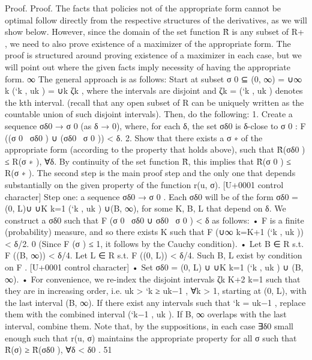 \documentclass[10pt]{article}
\begin{document}
\begin{ReviewVerbatim}
Proof. Proof. The facts that policies not of the appropriate form cannot be optimal follow directly
from the respective structures of the derivatives, as we will show below. However, since the domain
of the set function R̂ is any subset of R+ , we need to also prove existence of a maximizer of the
appropriate form. The proof is structured around proving existence of a maximizer in each case,
but we will point out where the given facts imply necessity of having the appropriate form.
∞
The general approach is as follows: Start at subset σ 0 ⊆ (0, ∞) = ∪∞
k (`k , uk ) = ∪k ζk , where
the intervals are disjoint and ζk = (`k , uk ) denotes the kth interval. (recall that any open subset of
R can be uniquely written as the countable union of such disjoint intervals).
Then, do the following:
1. Create a sequence σδ0 → σ 0 (as δ → 0), where, for each δ, the set σδ0 is δ-close to σ 0 : F ((σ 0 \
σδ0 ) ∪ (σδ0 \ σ 0 )) < δ.
2. Show that there exists a σ ∗ of the appropriate form (according to the property that holds
above), such that R̂(σδ0 ) ≤ R(σ ∗ ), ∀δ.
By continuity of the set function R̂, this implies that R̂(σ 0 ) ≤ R(σ ∗ ).
The second step is the main proof step and the only one that depends substantially on the given
property of the function r(u, σ).
[U+0001 control character]
Step one: a sequence σδ0 → σ 0 . Each σδ0 will be of the form σδ0 = (0, L)∪ ∪K
k=1 (`k , uk ) ∪(B, ∞),
for some K, B, L that depend on δ. We construct a σδ0 such that F (σ 0 \ σδ0 ∪ σδ0 \ σ 0 ) < δ as follows:
• F is a finite (probability) measure, and so there exists K such that F (∪∞
k=K+1 (`k , uk )) < δ/2.
0
(Since F (σ ) ≤ 1, it follows by the Cauchy condition).
• Let B ∈ R s.t. F ((B, ∞)) < δ/4. Let L ∈ R s.t. F ((0, L)) < δ/4. Such B, L exist by
condition on F .
[U+0001 control character]
• Set σδ0 = (0, L) ∪ ∪K
k=1 (`k , uk ) ∪ (B, ∞).
• For convenience, we re-index the disjoint intervals {ζk }K+2
k=1 such that they are in increasing
order, i.e. uk > `k ≥ uk−1 , ∀k > 1, starting at (0, L), with the last interval (B, ∞). If there
exist any intervals such that `k = uk−1 , replace them with the combined interval (`k−1 , uk ).
If {B, ∞} overlaps with the last interval, combine them.
Note that, by the suppositions, in each case ∃δ0 small enough such that r(u, σ) maintains the
appropriate property for all σ such that R̂(σ) ≥ R̂(σδ0 ), ∀δ < δ0 .
51



\end{ReviewVerbatim}
\end{document}
